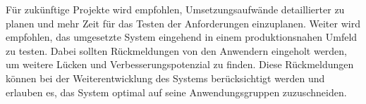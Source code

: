 Für zukünftige Projekte wird empfohlen, Umsetzungsaufwände detaillierter zu planen und mehr Zeit für das Testen der Anforderungen einzuplanen.
Weiter wird empfohlen, das umgesetzte System eingehend in einem produktionsnahen Umfeld zu testen.
Dabei sollten Rückmeldungen von den Anwendern eingeholt werden, um weitere Lücken und Verbesserungspotenzial zu finden.
Diese Rückmeldungen können bei der Weiterentwicklung des Systems berücksichtigt werden und erlauben es, das System optimal auf seine Anwendungsgruppen zuzuschneiden.

\clearpage
